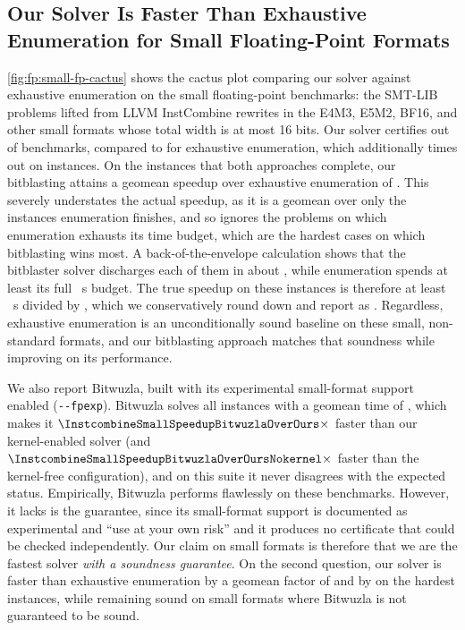 \subsection{Our Solver Is Faster Than Exhaustive Enumeration for Small Floating-Point Formats}

\cref{fig:fp:small-fp-cactus} shows the cactus plot comparing our solver
against exhaustive enumeration on the small floating-point benchmarks:
the \SmallFpNumTotal{} SMT-LIB problems lifted from LLVM InstCombine rewrites
in the E4M3, E5M2, BF16, and other small formats whose total width is at most 16 bits.
Our solver certifies \SmallFpNumSolvedOurs{} out of \SmallFpNumTotal{} benchmarks,
compared to \SmallFpNumSolvedNaive{} for exhaustive enumeration,
which additionally times out on \SmallFpNaiveTimeouts{} instances.
On the instances that both approaches complete, our bitblasting attains a
geomean speedup over exhaustive enumeration of \SmallFpTimeElapsedRatioON{}.
This severely understates the actual speedup,
as it is a geomean over only the instances enumeration finishes, and so ignores the \SmallFpNaiveTimeouts{} problems on which enumeration exhausts its
time budget, which are the hardest cases on which bitblasting wins most.
A back-of-the-envelope calculation shows that
the bitblaster solver discharges each of them in about \SmallFpGeomeanTimeFpLean{}, while enumeration
spends at least its full \FpConfigTimeoutSec{}~s budget.
The true speedup on these instances is therefore at least \FpConfigTimeoutSec{}~s
divided by \SmallFpGeomeanTimeFpLean{}, which we conservatively round down and report as \SmallFpTimeoutSpeedupLB{}.
Regardless, exhaustive enumeration is an unconditionally sound baseline on these small,
non-standard formats, and our bitblasting approach matches that soundness while improving on its performance.

We also report Bitwuzla, built with its experimental small-format support enabled (\texttt{-{}-fpexp}).
Bitwuzla solves all \InstcombineSmallNumSolvedBitwuzla{} instances with a geomean time of
\InstcombineSmallGeomeanTimeBitwuzla{}, which makes it
$\InstcombineSmallSpeedupBitwuzlaOverOurs\times$ faster than our kernel-enabled solver
(and $\InstcombineSmallSpeedupBitwuzlaOverOursNokernel\times$ faster than the kernel-free configuration),
and on this suite it never disagrees with the expected status.
Empirically, Bitwuzla performs flawlessly on these benchmarks.
However, it lacks is the guarantee, since its small-format support is documented as experimental and ``use at your own risk''
and it produces no certificate that could be checked independently.
Our claim on small formats is therefore that we are the fastest solver \emph{with a soundness guarantee}.
On the second question, our solver is faster than exhaustive enumeration by a geomean factor of \SmallFpTimeElapsedRatioON{} and by \SmallFpTimeoutSpeedupLB{} on the hardest instances,
while remaining sound on small formats where Bitwuzla is not guaranteed to be sound.

